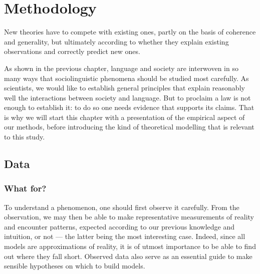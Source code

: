 \documentclass[../thesis.tex]{subfiles}
\begin{document}
\chapter{Methodology}
\label{ch:methods}

\epigraph{
  New theories have to compete with existing ones, partly on the basis of
  coherence and generality, but ultimately according to whether they explain existing
  observations and correctly predict new ones.
}{
}

As shown in the previous chapter, language and society are interwoven in so many ways
that sociolinguistic phenomena should be studied most carefully. As scientists, we would like to
establish general principles that explain reasonably well the interactions between society and
language. But to proclaim a law is not enough to establish it: to do so one needs
evidence that supports its claims. That is why we will start this chapter with a
presentation of the empirical aspect of our methods, before introducing the kind of
theoretical modelling that is relevant to this study.



\section{Data}
\subsection{What for?}
To understand a phenomenon, one should first observe it carefully. From the observation,
we may then be able to make representative measurements of reality and encounter
patterns, expected according to our previous knowledge and intuition, or not --- the
latter being the most interesting case. Indeed, since all models are approximations of
reality, it is of utmost importance to be able to find out where they fall short.
Observed data also serve as an essential guide to make sensible hypotheses on which to
build models.
\end{document}
